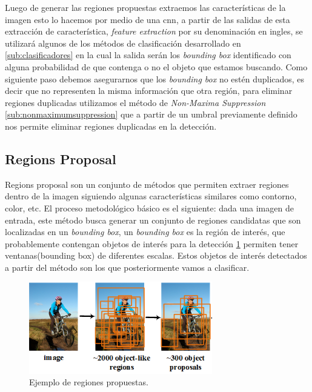 Luego de generar las regiones propuestas extraemos las características de la imagen esto lo hacemos por medio de una \ac{cnn}, a partir de las salidas de esta extracción de característica, \textit{feature extraction} por su denominación en ingles, se utilizará algunos de los métodos de clasificación desarrollado en \ref{sub:clasificadores} en la cual la salida serán los \textit{bounding box} identificado con alguna probabilidad de que contenga o no el objeto que estamos buscando. Como siguiente paso debemos  asegurarnos que los \textit{bounding box} no estén duplicados, es decir que no representen la misma información que otra región, para eliminar regiones duplicadas utilizamos el método de \textit{Non-Maxima Suppression} \ref{sub:nonmaximumsuppression} que a partir de un umbral previamente definido nos permite eliminar regiones duplicadas en la detección.



\subsection{Regions Proposal} \label{sub:regions-proposal}

Regions proposal son un conjunto de métodos que permiten extraer regiones dentro de la imagen siguiendo algunas características similares como contorno, color, etc. El proceso metodológico básico es el siguiente: dada una imagen de entrada, este método busca generar un conjunto de regiones candidatas que son localizadas en un \textit{bounding box}, un \textit{bounding box} es la región de interés, que probablemente contengan objetos de interés para la detección \ref{Fig: propsalregion} permiten tener ventanas(bounding box) de diferentes escalas. Estos objetos de interés detectados a partir del método son los que posteriormente vamos a clasificar.

\begin{figure}[H]
 \centering
  \includegraphics[height=4cm,keepaspectratio=true,clip=true]{imagenes/MarcoTeorico/regionProposal.png}
  \caption{Ejemplo de regiones propuestas.}%
	\label{Fig: propsalregion}
\end{figure}

